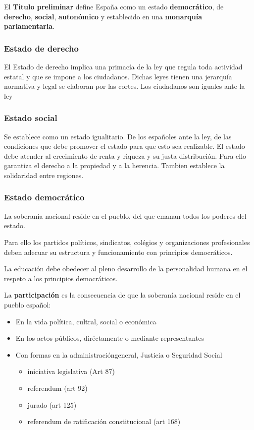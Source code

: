     El \textbf{Titulo preliminar} define España como un estado \textbf{democrático}, de \textbf{derecho}, \textbf{social}, \textbf{autonómico} y establecido en una \textbf{monarquía parlamentaria}.

    \subsubsection{Estado de derecho}
        El Estado de derecho implica una primacía de la ley que regula toda actividad estatal y que se impone a los ciudadanos. Dichas leyes tienen una jerarquía normativa y legal  se elaboran por las cortes. Los ciudadanos son iguales ante la ley

    \subsubsection{Estado social}
        Se establece como un estado igualitario. De los españoles ante la ley, de las condiciones que debe promover el estado para que esto sea realizable. El estado debe atender al crecimiento de renta y riqueza y su justa distribución. Para ello garantiza el derecho a la propiedad y a la herencia. Tambien establece la solidaridad entre regiones.

    \subsubsection{Estado democrático}
        La soberanía nacional reside en el pueblo, del que emanan todos los poderes del estado.

        Para ello los partidos políticos, sindicatos, colégios y organizaciones profesionales deben adecuar su estructura y funcionamiento con principios democráticos.

        La educación debe obedecer al pleno desarrollo de la personalidad humana en el respeto a los principios democráticos.

        La \textbf{participación} es la consecuencia de que la soberanía nacional reside en el pueblo español:
        \begin{itemize}
            \item En la vida política, cultral, social o económica
            \item En los actos públicos, diréctamente o mediante representantes
            \item Con formas en la administracióngeneral, Justicia o Seguridad Social
            \begin{itemize}
                \item iniciativa legislativa (Art 87)
                \item referendum (art 92)
                \item jurado (art 125)
                \item referendum de ratificación constitucional (art 168)
            \end{itemize}
        \end{itemize}

